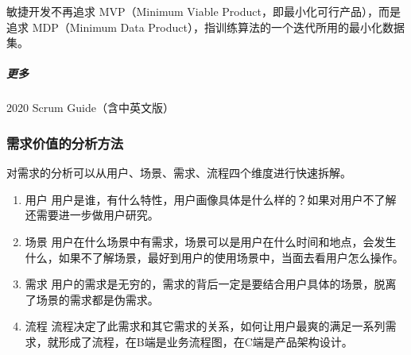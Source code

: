 \documentclass[letterpaper,11pt,english]{sphinxmanual}
\begin{document}
敏捷开发不再追求 MVP（Minimum Viable
Product，即最小化可行产品），而是追求 MDP（Minimum Data
Product），指训练算法的一个迭代所用的最小化数据集。
%
\begin{footnote}[745]\sphinxAtStartFootnote
{}
%
\end{footnote}


\subparagraph{更多}
\label{\detokenize{chapter_project/Scrum:id21}}
2020 Scrum
Guide（含中英文版）%
\begin{footnote}[746]\sphinxAtStartFootnote
{}
%
\end{footnote}

%
\begin{footnote}[747]\sphinxAtStartFootnote
{}
%
\end{footnote}


\subsubsection{需求价值的分析方法}
\label{\detokenize{chapter_project/separate_need:id1}}\label{\detokenize{chapter_project/separate_need::doc}}
对需求的分析可以从用户、场景、需求、流程四个维度进行快速拆解。
\begin{enumerate}
%
\item {} 
用户
用户是谁，有什么特性，用户画像具体是什么样的？如果对用户不了解还需要进一步做用户研究。

\item {} 
场景
用户在什么场景中有需求，场景可以是用户在什么时间和地点，会发生什么，如果不了解场景，最好到用户的使用场景中，当面去看用户怎么操作。

\item {} 
需求
用户的需求是无穷的，需求的背后一定是要结合用户具体的场景，脱离了场景的需求都是伪需求。

\item {} 
流程
流程决定了此需求和其它需求的关系，如何让用户最爽的满足一系列需求，就形成了流程，在B端是业务流程图，在C端是产品架构设计。

\end{enumerate}
\end{document}
